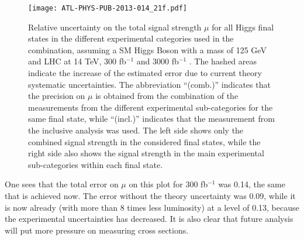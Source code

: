 \begin{figure}[htpb]
  \centering
  \texttt{[image: ATL-PHYS-PUB-2013-014\_21f.pdf]}
  \caption{\label{fig:HGam_prospection}
    Relative uncertainty on the total signal strength $\mu$ for all Higgs final states in the different experimental categories used in the combination, assuming a SM Higgs Boson with a mass of 125 GeV and LHC at 14 TeV, 300 fb$^{-1}$ and 3000 fb$^{-1}$ .
    The hashed areas indicate the increase of the estimated error due to current theory systematic uncertainties.
    The abbreviation ``(comb.)'' indicates that the precision on $\mu$ is obtained from the combination of the measurements from the different experimental sub-categories  for the same final state, while “(incl.)” indicates that the measurement from the inclusive analysis was used.
    The left side shows only the combined signal strength in the considered final states, while the right side also shows the signal strength in the main experimental sub-categories within each final state. 
   \cite{ATL-PHYS-PUB-2013-014}
  }
\end{figure}
One sees that the total error on $\mu $ on this plot for 300 fb$^{-1}$ was 0.14, the same that is achieved now.
The error without the theory uncertainty was 0.09, while it is now already (with more than 8 times less luminosity) at a level of 0.13, because the experimental uncertainties has decreased.
It is also clear that future analysis will put more pressure on measuring cross sections.


